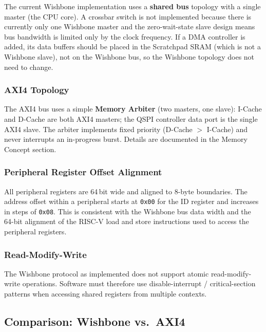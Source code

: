 The current Wishbone implementation uses a \textbf{shared bus} topology
with a single master (the CPU core).
A crossbar switch is not implemented because there is currently only one
Wishbone master and the zero-wait-state slave design means bus bandwidth
is limited only by the clock frequency.
If a DMA controller is added, its data buffers should be placed in the
Scratchpad SRAM (which is not a Wishbone slave), not on the Wishbone bus,
so the Wishbone topology does not need to change.

\subsubsection{AXI4 Topology}

The AXI4 bus uses a simple \textbf{Memory Arbiter} (two masters, one slave):
I-Cache and D-Cache are both AXI4 masters; the QSPI controller data port
is the single AXI4 slave.
The arbiter implements fixed priority (D-Cache $>$ I-Cache) and never
interrupts an in-progress burst.
Details are documented in the Memory Concept section.

\subsubsection{Peripheral Register Offset Alignment}

All peripheral registers are 64\,bit wide and aligned to 8-byte boundaries.
The address offset within a peripheral starts at \texttt{0x00} for the
ID register and increases in steps of \texttt{0x08}.
This is consistent with the Wishbone bus data width and the 64-bit
alignment of the RISC-V load and store instructions used to access the
peripheral registers.

\subsubsection{Read-Modify-Write}

The Wishbone protocol as implemented does not support atomic
read-modify-write operations.
Software must therefore use disable-interrupt / critical-section
patterns when accessing shared registers from multiple contexts.

\subsection{Comparison: Wishbone vs.\ AXI4}

